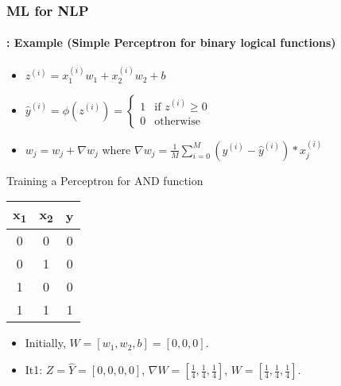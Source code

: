 \documentclass[xcolor=table]{beamer}
\begin{document}
		\begin{frame}
		\frametitle{ML for NLP}
		\framesubtitle{\insertsection: Example (Simple Perceptron for binary logical functions)}
		
		\begin{minipage}{0.30\textwidth} 
		\end{minipage}
		\begin{minipage}{0.59\textwidth}
			\scriptsize
			\begin{itemize}
				\item $ z^{(i)} = x_1^{(i)} w_1 + x_2^{(i)} w_2 + b $
				\item $ \hat{y}^{(i)} = \phi(z^{(i)}) = \begin{cases}
					1 & \text{if } z^{(i)} \ge 0 \\
					0 & \text{otherwise}
				\end{cases} $
				\item $ w_j = w_j + \nabla w_j$ where $ \nabla w_j = \frac{1}{M}\sum_{i=0}^{M} (y^{(i)} - \hat{y}^{(i)}) * x_j^{(i)} $
			\end{itemize}
		\end{minipage}
	
		\vfill
	
		\begin{exampleblock}{Training a Perceptron for AND function}
			\begin{minipage}{0.2\textwidth} 
				\scriptsize
				\begin{tabular}{|c|c|c|}
					\hline
					x\textsubscript{1} & x\textsubscript{2} & y \\
					\hline
					0 & 0 & 0  \\
					\hline
					0 & 1 & 0 \\
					\hline
					1 & 0 & 0 \\
					\hline
					1 & 1 & 1 \\
					\hline
				\end{tabular}
			\end{minipage}
			\begin{minipage}{0.79\textwidth}
				\scriptsize
				\begin{itemize}
					\item Initially, $ W = [w_1, w_2, b] = [0, 0, 0] $.
					
					\item It1: $ Z = \hat{Y} = [0, 0, 0, 0] $, 
					$ \nabla W = [\frac{1}{4}, \frac{1}{4}, \frac{1}{4}] $, 
					$ W = [\frac{1}{4}, \frac{1}{4}, \frac{1}{4}] $.
					

\end{itemize}
\end{minipage}
\end{exampleblock}
\end{frame}
\end{document}
